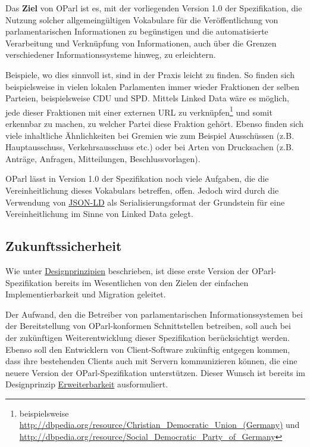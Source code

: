 \documentclass[,a4paper]{article}
\begin{document}
Das \textbf{Ziel} von OParl ist es, mit der vorliegenden Version 1.0 der
Spezifikation, die Nutzung solcher allgemeingültigen Vokabulare für die
Veröffentlichung von parlamentarischen Informationen zu begünstigen und
die automatisierte Verarbeitung und Verknüpfung von Informationen, auch
über die Grenzen verschiedener Informationssysteme hinweg, zu
erleichtern.

Beispiele, wo dies sinnvoll ist, sind in der Praxis leicht zu finden. So
finden sich beispielsweise in vielen lokalen Parlamenten immer wieder
Fraktionen der selben Parteien, beispielsweise CDU und SPD. Mittels
Linked Data wäre es möglich, jede dieser Fraktionen mit einer externen
URL zu verknüpfen\footnote{beispielsweise
  \url{http://dbpedia.org/resource/Christian_Democratic_Union_(Germany)}
  und
  \url{http://dbpedia.org/resource/Social_Democratic_Party_of_Germany}}
und somit erkennbar zu machen, zu welcher Partei diese Fraktion gehört.
Ebenso finden sich viele inhaltliche Ähnlichkeiten bei Gremien wie zum
Beispiel Ausschüssen (z.B. Hauptausschuss, Verkehrsausschuss etc.) oder
bei Arten von Drucksachen (z.B. Anträge, Anfragen, Mitteilungen,
Beschlussvorlagen).

OParl lässt in Version 1.0 der Spezifikation noch viele Aufgaben, die
die Vereinheitlichung dieses Vokabulars betreffen, offen. Jedoch wird
durch die Verwendung von \hyperref[jsonld]{JSON-LD} als
Serialisierungsformat der Grundstein für eine Vereinheitlichung im Sinne
von Linked Data gelegt.

\subsection{Zukunftssicherheit}\label{zukunftssicherheit}

Wie unter \hyperref[designprinzipien]{Designprinzipien} beschrieben, ist
diese erste Version der OParl-Spezifikation bereits im Wesentlichen von
den Zielen der einfachen Implementierbarkeit und Migration geleitet.

Der Aufwand, den die Betreiber von parlamentarischen
Informationssystemen bei der Bereitstellung von OParl-konformen
Schnittstellen betreiben, soll auch bei der zukünftigen
Weiterentwicklung dieser Spezifikation berücksichtigt werden. Ebenso
soll den Entwicklern von Client-Software zukünftig entgegen kommen, dass
ihre bestehenden Clients auch mit Servern kommunizieren können, die eine
neuere Version der OParl-Spezifikation unterstützen. Dieser Wunsch ist
bereits im Designprinzip \hyperref[erweiterbarkeit]{Erweiterbarkeit}
ausformuliert.
\end{document}
